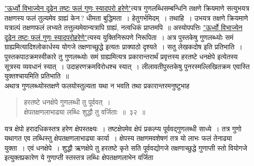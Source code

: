 \documentclass[11pt, openany]{book}
\begin{document}
\hyperref[28]{"ऊर्ध्वो विभाज्येन दृढेन तष्टः फलं गुणः स्यादपरो हरेणे"}त्यत्र गुणलब्धिसम्बन्धिनि तक्षणे क्रियमाणे सत्युभयत्र तक्षणस्य फलं तुल्यमेव ग्राह्यं केन\,? धीमता बुद्धिमता~। हेतुगर्भमिदम्~। तथाहि~। उभयत्र तक्षणे क्रियमाणे 
यत्राल्पं तक्षणफलं लभ्यते तत्तुल्यमेवान्यत्रापि ग्राह्यं, नत्वधिकं प्राप्तमपि~॥ 
अस्योपपत्तिः \hyperref[28]{"ऊर्ध्वो विभाज्येन दृढेन तष्टः फलं गुणः
स्यादपरोहरेणे"}त्यस्य युक्तिनिरूपणे निरूपिता~। अत्र पुस्तकेषु गुणलब्ध्योः समं
ग्राह्यमित्यादिश्लोकार्धस्य योगजे तक्षणाच्छुद्धे इत्यतः प्राक्पाठो दृश्यते~। सतु
लेखकदोष इति प्रतिभाति~। पुस्तकपाठक्रमस्वीकारे तु गुणलब्ध्योः समं
ग्राह्यमित्यत्र प्रकारान्तरार्थं प्रवृत्तस्य हरतष्टे धनक्षेपे इत्येतस्य सूत्रस्य
व्यवधानं स्यात्~। उदाहरणक्रमविरोधश्च स्यात्~। लीलावतीपुस्तकेषु पुनरस्मल्लिखितक्रम
एवास्ति युक्तश्चायमिति प्रतिभाति~॥ \\

\vspace{-3mm}
 अथात्र गुणलब्ध्योस्तक्षणे फलयोस्तुल्यता यथा न भवति तथा प्रकारान्तरमनुष्टुभाह\textendash 
\begin{quote}
    \bs
 हरतष्टे धनक्षेपे गुणलब्धी तु पूर्ववत्~। \\

\vspace{-7mm}
\hspace{1cm} क्षेपतक्षणलाभाढ्या लब्धिः शुद्धौ तु वर्जिताः~॥~३२~॥ 
\end{quote}

 यत्र क्षेपो हरादधिकस्तत्र हरेण क्षेपस्तक्ष्यः~। तष्टक्षेपमेव क्षेपं प्रकल्प्य 
पूर्ववद्गुणलब्धी साध्ये~। तत्र गुणो यथागत एव लब्धिस्तु क्षेपतक्षणलाभाढ्या 
कार्या~। क्षेपस्य तक्षणमवशेषणं तत्र यो लाभः फलं तेनाढ्या युक्ता~। एवं 
धनक्षेपे~। शुद्धौ ऋणक्षेपे तु हरतष्टे कृते सति पूर्ववद्योगजे तक्षणाच्छुद्धे 
गुणाप्ती स्तो वियोगजे इत्युक्तप्रकारेण ये गुणाप्ती स्तस्तत्र लब्धिः क्षेपतक्षणलाभेन वर्जिता

\newpage%
\end{document}
